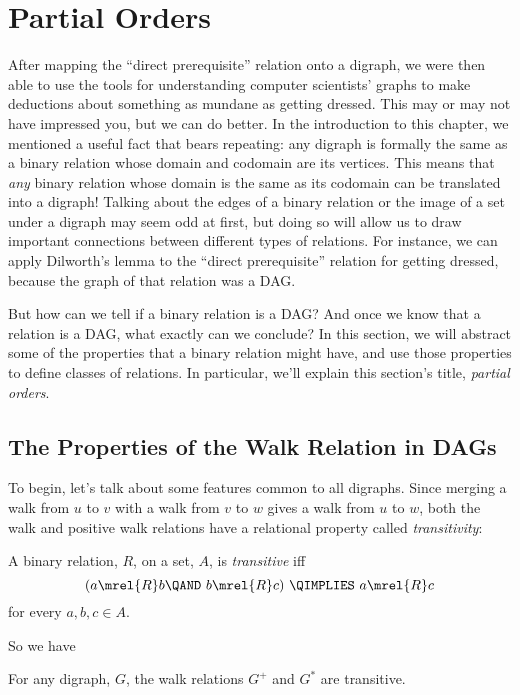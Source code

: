 \section{Partial Orders}\label{partial_order_sec}

After mapping the ``direct prerequisite'' relation onto a digraph, we
were then able to use the tools for understanding computer scientists'
graphs to make deductions about something as mundane as getting
dressed.  This may or may not have impressed you, but we can do
better.  In the introduction to this chapter, we mentioned a useful
fact that bears repeating: any digraph is formally the same as a
binary relation whose domain and codomain are its vertices.  This
means that \emph{any} binary relation whose domain is the same as its
codomain can be translated into a digraph!  Talking about the edges of
a binary relation or the image of a set under a digraph may seem odd
at first, but doing so will allow us to draw important connections
between different types of relations.  For instance, we can apply
Dilworth's lemma to the ``direct prerequisite'' relation for getting
dressed, because the graph of that relation was a DAG.

But how can we tell if a binary relation is a DAG?  And once we know
that a relation is a DAG, what exactly can we conclude?  In this
section, we will abstract some of the properties that a binary
relation might have, and use those properties to define classes of
relations.  In particular, we'll explain this section's title,
\emph{partial orders}.

\subsection{The Properties of the Walk Relation in DAGs}

To begin, let's talk about some features common to all digraphs.
Since merging a walk from $u$ to $v$ with a walk from $v$ to $w$ gives
a walk from $u$ to $w$, both the walk and positive walk%
relations have a relational property%
called \emph{transitivity}:

\begin{definition}
A binary relation, $R$, on a set, $A$, is
\emph{transitive}%
 iff
\[
(a \mrel{R}  b \QAND\ b \mrel{R}  c)\ \QIMPLIES\  a \mrel{R}  c
\]
\quad for every $a,b,c\in A$.
\end{definition}
So we have
\begin{lemma}
For any digraph, $G$, the walk relations $G^+$ and $G^*$ are transitive.
\end{lemma}

